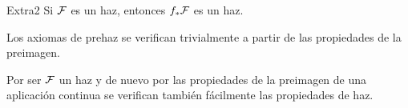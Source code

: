 \documentclass[twoside]{article}
\begin{document}
%
\newpage
%
\begin{ejercicio}{Extra2}
Si $\mathcal{F}$ es un haz, entonces $f_*\mathcal{F}$ es un haz. 
\end{ejercicio}
\begin{solucion}
Los axiomas de prehaz se verifican trivialmente a partir de las propiedades de la preimagen. 

Por ser $\mathcal{F}$ un haz y de nuevo por las propiedades de la preimagen de una aplicación continua se verifican también fácilmente las propiedades de haz.
\end{solucion}
%
%
%
%
%
%
%
%
%
%
\end{document}
